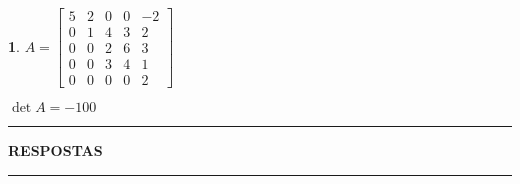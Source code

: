 \documentclass[12pt]{exam}
\newtheorem{exercicio}{}
\begin{document}
\begin{exercicio}\label{determinantefim}
$A = \begin{bmatrix}
    5 & 2 & 0 & 0 & -2\\
    0 & 1 & 4 & 3 & 2\\
    0 & 0 & 2 & 6 & 3\\
    0 & 0 & 3 & 4 & 1\\
    0 & 0 & 0 & 0 & 2
  \end{bmatrix}$
\begin{solucao}
  $\det A = -100$
\end{solucao}
\end{exercicio}

\newpage
{}
\hrule
\begin{center}
{\large\bf RESPOSTAS}
\end{center}
\hrule

\end{document}
